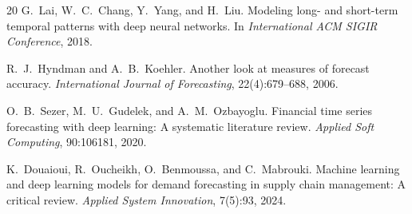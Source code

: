 \documentclass[11pt]{article}
\begin{document}
\begin{thebibliography}{20}
G.~Lai, W.~C.~Chang, Y.~Yang, and H.~Liu.
\newblock Modeling long- and short-term temporal patterns with deep neural networks.
\newblock In \emph{International ACM SIGIR Conference}, 2018.

R.~J.~Hyndman and A.~B.~Koehler.
\newblock Another look at measures of forecast accuracy.
\newblock \emph{International Journal of Forecasting}, 22(4):679--688, 2006.

O.~B.~Sezer, M.~U.~Gudelek, and A.~M.~Ozbayoglu.
\newblock Financial time series forecasting with deep learning: A systematic literature review.
\newblock \emph{Applied Soft Computing}, 90:106181, 2020.

K.~Douaioui, R.~Oucheikh, O.~Benmoussa, and C.~Mabrouki.
\newblock Machine learning and deep learning models for demand forecasting in
  supply chain management: A critical review.
\newblock \emph{Applied System Innovation}, 7(5):93, 2024.

\end{thebibliography}
\end{document}
